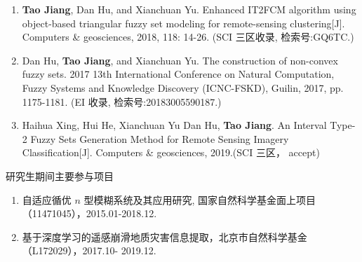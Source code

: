 \begin{paper}
  \begin{enumerate}
    \item \textbf{Tao Jiang}, Dan Hu, and Xianchuan Yu.  Enhanced IT2FCM algorithm using object-based triangular fuzzy set modeling for remote-sensing clustering[J]. Computers \& geosciences, 2018, 118: 14-26. (SCI 三区收录, 检索号:GQ6TC.)
    \item Dan Hu, \textbf{Tao Jiang}, and Xianchuan Yu. The construction of non-convex fuzzy sets. 2017 13th International Conference on Natural Computation, Fuzzy Systems and Knowledge  Discovery (ICNC-FSKD), Guilin, 2017, pp. 1175-1181. (EI 收录, 检索号:20183005590187.)
    \item Haihua Xing, Hui He, Xianchuan Yu Dan Hu, \textbf{Tao Jiang}.  An Interval Type-2 Fuzzy Sets Generation Method for Remote Sensing Imagery Classification[J]. Computers \& geosciences, 2019.(SCI 三区， accept) \\
  \end{enumerate}

\end{paper}





\begin{center}
  \large {\hei 研究生期间主要参与项目 }
\end{center}

\begin{enumerate}[(1)]
  \item 自适应循优 $n$ 型模糊系统及其应用研究, 国家自然科学基金面上项目（11471045），2015.01-2018.12.

  \item 基于深度学习的遥感崩滑地质灾害信息提取，北京市自然科学基金（L172029），2017.10-
        2019.12.\\

\end{enumerate}

